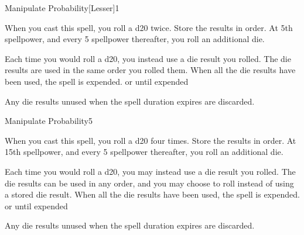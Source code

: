 \begin{spellsection}{Manipulate Probability}[Lesser]{1}
    \begin{spellheader}
    \end{spellheader}
    \begin{spellcontent}
        \begin{spelltargetinginfo}
        \end{spelltargetinginfo}
        \begin{spelleffects}
            \spelleffect When you cast this spell, you roll a d20 twice. Store the results in order. At 5th spellpower, and every 5 spellpower thereafter, you roll an additional die.

            Each time you would roll a d20, you instead use a die result you rolled. The die results are used in the same order you rolled them. When all the die results have been used, the spell is expended.
            \spelldur \durshort or until expended
        \end{spelleffects}
    \end{spellcontent}
    \begin{spellfooter}
        \spellnotes Any die results unused when the spell duration expires are discarded.
        \miscastexplode
    \end{spellfooter}
\end{spellsection}

\begin{spellsection}{Manipulate Probability}{5}
    \begin{spellheader}
    \end{spellheader}
    \begin{spellcontent}
        \begin{spelltargetinginfo}
        \end{spelltargetinginfo}
        \begin{spelleffects}
            \spelleffect When you cast this spell, you roll a d20 four times. Store the results in order. At 15th spellpower, and every 5 spellpower thereafter, you roll an additional die.

            Each time you would roll a d20, you may instead use a die result you rolled. The die results can be used in any order, and you may choose to roll instead of using a stored die result. When all the die results have been used, the spell is expended.
            \spelldur \durshort or until expended
        \end{spelleffects}
    \end{spellcontent}
    \begin{spellfooter}
        \spellnotes Any die results unused when the spell duration expires are discarded.
        \miscastexplode
    \end{spellfooter}
\end{spellsection}

